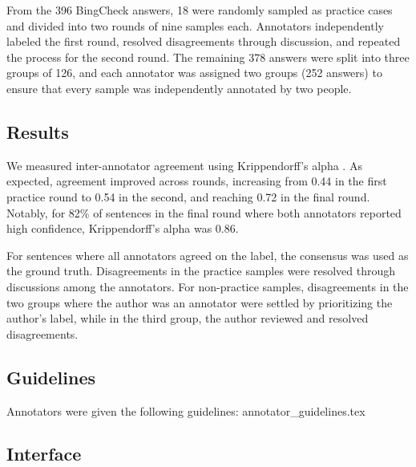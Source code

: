 From the 396 BingCheck answers, 18 were randomly sampled as practice cases and divided into two rounds of nine samples each. Annotators independently labeled the first round, resolved disagreements through discussion, and repeated the process for the second round. The remaining 378 answers were split into three groups of 126, and each annotator was assigned two groups (252 answers) to ensure that every sample was independently annotated by two people.

\subsection{Results}
We measured inter-annotator agreement using Krippendorff’s alpha \citep{krippendorff:2013, castro:2017}. As expected, agreement improved across rounds, increasing from 0.44 in the first practice round to 0.54 in the second, and reaching 0.72 in the final round. Notably, for 82\% of sentences in the final round where both annotators reported high confidence, Krippendorff's alpha was 0.86.

For sentences where all annotators agreed on the label, the consensus was used as the ground truth. Disagreements in the practice samples were resolved through discussions among the annotators. For non-practice samples, disagreements in the two groups where the author was an annotator were settled by prioritizing the author’s label, while in the third group, the author reviewed and resolved disagreements.

\clearpage

\onecolumn
\subsection{Guidelines}
\label{app:ann_guidelines}

Annotators were given the following guidelines:
{annotator_guidelines.tex}
\twocolumn

\subsection{Interface}
\label{app:ann_interface}


